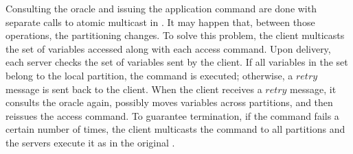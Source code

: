 Consulting the oracle and issuing the application command are done with separate calls to atomic multicast in \dssmr{}.
It may happen that, between those operations, the partitioning changes.
To solve this problem, the client multicasts the set of variables accessed along with each access command.
Upon delivery, each server checks the set of variables sent by the client.
If all variables in the set belong to the local partition, the command is executed; otherwise, a $retry$ message is sent back to the client.
When the client receives a $retry$ message, it consults the oracle again, possibly moves variables across partitions, and then reissues the access command.
To guarantee termination, if the command fails a certain number of times, the client multicasts the command to all partitions and the servers execute it as in the original \ssmr{}.

%

